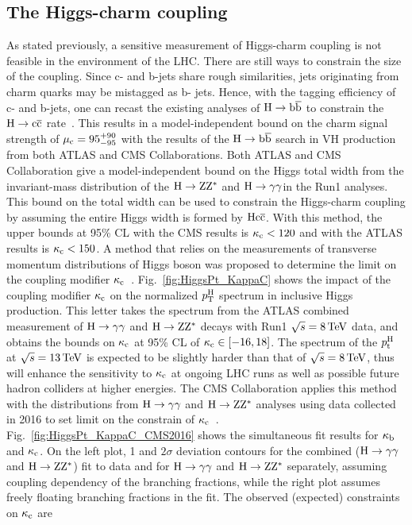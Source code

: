 \subsection*{The Higgs-charm coupling}
As stated previously, a sensitive measurement of Higgs-charm coupling is not feasible in the environment of the LHC. There are still ways to constrain the size of the coupling. Since c- and b-jets share rough similarities, jets originating from charm quarks may be mistagged as b- jets. Hence, with the tagging efficiency of c- and b-jets, one can recast the existing analyses of $\mathrm{H}\to\mathrm{b}\overline{\mathrm{b}}$ to constrain the $\mathrm{H}\to\mathrm{c}\overline{\mathrm{c}}$ rate~\cite{Perez:2015aoa}. This results in a model-independent bound on the charm signal strength of $\mu_{\mathrm{c}}=95^{+90}_{-95}$ with the results of the $\mathrm{H}\to\mathrm{b}\overline{\mathrm{b}}$ search in VH production from both ATLAS and CMS Collaborations. 
Both ATLAS and CMS Collaboration give a model-independent bound on the Higgs total width from the invariant-mass distribution of the $\mathrm{H}\to\mathrm{Z}\mathrm{Z}^{*}$ and $\mathrm{H}\to\gamma\gamma$in the Run1 analyses. This bound on the total width can be used to constrain the Higgs-charm coupling by assuming the entire Higgs width is formed by $\mathrm{H}\mathrm{c}\overline{\mathrm{c}}$. With this method, the upper bounds at 95\% CL with the CMS results is $\kappa_{\mathrm{c}}<120$ and with the ATLAS results is $\kappa_{\mathrm{c}}<150$. 
A method that relies on the measurements of transverse momentum distributions of Higgs boson was proposed to determine the limit on the coupling modifier $\kappa_{\mathrm{c}}$~\cite{Bishara:2016jga}. Fig.~\ref{fig:HiggsPt_KappaC} shows the impact of the coupling modifier $\kappa_{\mathrm{c}}$ on the normalized $p_{\text{T}}^{\mathrm{H}}$ spectrum in inclusive Higgs production. This letter takes the \pt spectrum from the ATLAS combined measurement of $\mathrm{H}\to\gamma\gamma$ and $\mathrm{H}\to\mathrm{Z}\mathrm{Z}^{*}$ decays with Run1 $\sqrt{s}=8\,\text{Te\hspace{-.08em}V}$ data, and obtains the bounds on $\kappa_{\mathrm{c}}$ at 95\% CL of $\kappa_{\mathrm{c}}\in [-16,18]$. The spectrum of the $p_{\text{t}}^{\mathrm{H}}$ at $\sqrt{s}=13\,\text{Te\hspace{-.08em}V}$ is expected to be slightly harder than that of $\sqrt{s}=8\,\text{Te\hspace{-.08em}V}$, thus will enhance the sensitivity to $\kappa_{\mathrm{c}}$ at ongoing LHC runs as well as possible future hadron colliders at higher energies. The CMS Collaboration applies this method with the distributions from $\mathrm{H}\to\gamma\gamma$ and $\mathrm{H}\to\mathrm{Z}\mathrm{Z}^{*}$ analyses using data collected in 2016 to set limit on the constrain of $\kappa_{\mathrm{c}}$~\cite{CMS-PAS-HIG-17-028}. Fig.~\ref{fig:HiggsPt_KappaC_CMS2016} shows the simultaneous fit results for $\kappa_{\mathrm{b}}$ and $\kappa_{\mathrm{c}}$. On the left plot, 1 and $2\sigma$ deviation contours for the combined ($\mathrm{H}\to\gamma\gamma$ and $\mathrm{H}\to\mathrm{Z}\mathrm{Z}^{*}$) fit to data and for $\mathrm{H}\to\gamma\gamma$ and $\mathrm{H}\to\mathrm{Z}\mathrm{Z}^{*}$ separately, assuming coupling dependency of the branching fractions, while the right plot assumes freely floating branching fractions in the fit. The observed (expected) constraints on $\kappa_{\mathrm{c}}$ are
